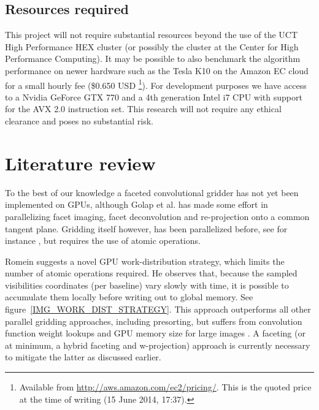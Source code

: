 \documentclass[a4paper, two column]{article}
\begin{document}
\subsection{Resources required} 
This project will not require substantial resources beyond the use of the UCT High Performance HEX cluster (or possibly the cluster at the Center for High Performance Computing). It may be possible to also benchmark the algorithm performance
on newer hardware such as the Tesla K10 on the Amazon EC cloud for a small hourly fee (\$0.650 USD \footnote{Available from \url{http://aws.amazon.com/ec2/pricing/}. This is the quoted price at the time of writing (15 June 2014, 17:37).}). For development purposes we have 
access to a Nvidia GeForce GTX 770 and a 4th generation Intel i7 CPU with support for the AVX 2.0 instruction set. This research will not require any ethical clearance and poses no substantial risk.

\section{Literature review}
To the best of our knowledge a faceted convolutional gridder has not yet been implemented on GPUs, although Golap et al. \cite{golap2001parallelization} has 
made some effort in parallelizing facet imaging, facet deconvolution and re-projection onto a common tangent plane. Gridding itself however, has been parallelized 
before, see for instance \cite{varbanescu2008performance,romein2012efficient,muscat2014high}, but requires the use of atomic operations.
 
Romein \cite{romein2012efficient} suggests a novel GPU work-distribution strategy, which limits the number of atomic operations required. He observes that, because 
the sampled visibilities coordinates (per baseline) vary slowly with time, it is possible to accumulate them locally before writing out to global memory. See 
figure~\ref{IMG_WORK_DIST_STRATEGY}. This approach outperforms all other parallel gridding approaches, including presorting, but suffers from convolution function 
weight lookups and GPU memory size for large images \cite{muscat2014high}. A faceting (or at minimum, a hybrid faceting and w-projection) approach is currently 
necessary to mitigate the latter as discussed earlier.
\end{document}
